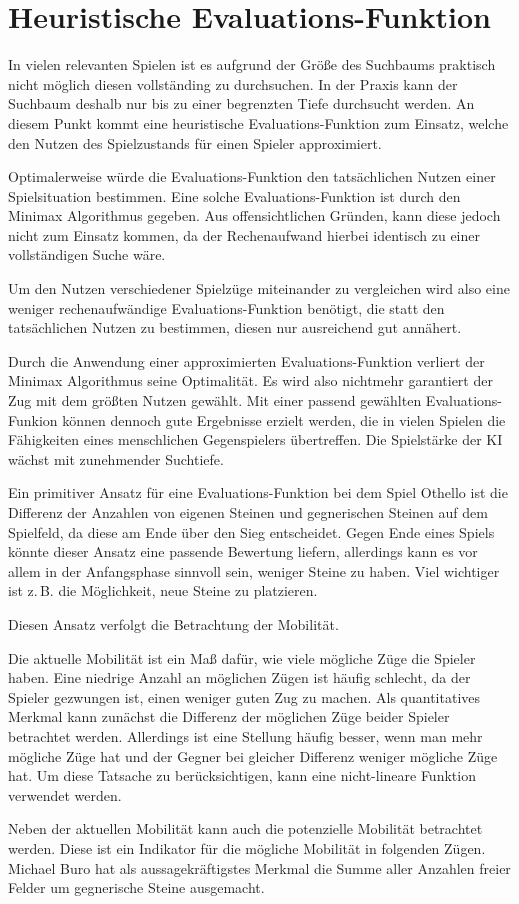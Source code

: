 \section{Heuristische Evaluations-Funktion}

In vielen relevanten Spielen ist es aufgrund der Größe des Suchbaums praktisch nicht möglich diesen vollständing zu
durchsuchen. In der Praxis kann der Suchbaum deshalb nur bis zu einer begrenzten Tiefe durchsucht werden. An diesem
Punkt kommt eine heuristische Evaluations-Funktion zum Einsatz, welche den Nutzen des Spielzustands für einen Spieler
approximiert.
\cite[S.~171]{ai2010russel}

Optimalerweise würde die Evaluations-Funktion den tatsächlichen Nutzen einer Spielsituation bestimmen. Eine solche
Evaluations-Funktion ist durch den Minimax Algorithmus gegeben. Aus offensichtlichen Gründen, kann diese jedoch nicht
zum Einsatz kommen, da der Rechenaufwand hierbei identisch zu einer vollständigen Suche wäre.

Um den Nutzen verschiedener Spielzüge miteinander zu vergleichen wird also eine weniger rechenaufwändige
Evaluations-Funktion benötigt, die statt den tatsächlichen Nutzen zu bestimmen, diesen nur ausreichend gut annähert.

Durch die Anwendung einer approximierten Evaluations-Funktion verliert der Minimax Algorithmus seine Optimalität. Es
wird also nichtmehr garantiert der Zug mit dem größten Nutzen gewählt. Mit einer passend gewählten Evaluations-Funkion
können dennoch gute Ergebnisse erzielt werden, die in vielen Spielen die Fähigkeiten eines menschlichen Gegenspielers
übertreffen. Die Spielstärke der KI wächst mit zunehmender Suchtiefe.


Ein primitiver Ansatz für eine Evaluations-Funktion bei dem Spiel Othello ist die Differenz der Anzahlen von eigenen
Steinen und gegnerischen Steinen auf dem Spielfeld, da diese am Ende über den Sieg entscheidet. Gegen Ende eines Spiels
könnte dieser Ansatz eine passende Bewertung liefern, allerdings kann es vor allem in der Anfangsphase sinnvoll sein,
weniger Steine zu haben. Viel wichtiger ist z.\,B. die Möglichkeit, neue Steine zu platzieren.

Diesen Ansatz verfolgt die Betrachtung der Mobilität.

Die aktuelle Mobilität ist ein Maß dafür, wie viele mögliche Züge die Spieler haben. Eine niedrige Anzahl an möglichen
Zügen ist häufig schlecht, da der Spieler gezwungen ist, einen weniger guten Zug zu machen. Als quantitatives Merkmal
kann zunächst die Differenz der möglichen Züge beider Spieler betrachtet werden. Allerdings ist eine Stellung häufig
besser, wenn man mehr mögliche Züge hat und der Gegner bei gleicher Differenz weniger mögliche Züge hat. Um diese
Tatsache zu berücksichtigen, kann eine nicht-lineare Funktion verwendet werden.
\cite[S. 7]{evaluationfunctions}

Neben der aktuellen Mobilität kann auch die potenzielle Mobilität betrachtet werden. Diese ist ein Indikator für die
mögliche Mobilität in folgenden Zügen. Michael Buro hat als aussagekräftigstes Merkmal die Summe aller Anzahlen freier
Felder um gegnerische Steine ausgemacht.
\cite[S. 8f.]{evaluationfunctions}
